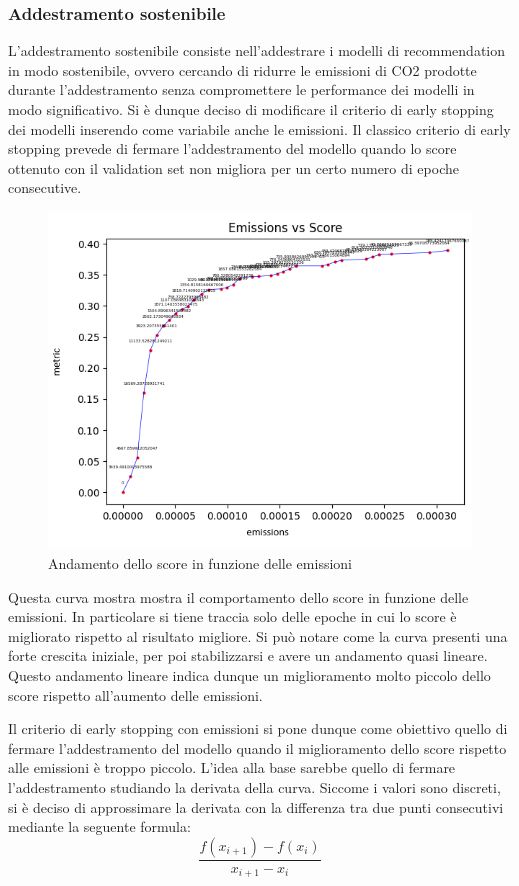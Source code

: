 \subsubsection{Addestramento sostenibile}
L'addestramento sostenibile consiste nell'addestrare i modelli di recommendation in modo sostenibile, ovvero cercando di ridurre le emissioni di CO2 prodotte durante l'addestramento senza compromettere le performance dei modelli in modo significativo.
Si è dunque deciso di modificare il criterio di early stopping dei modelli inserendo come variabile anche le emissioni.
Il classico criterio di early stopping prevede di fermare l'addestramento del modello quando lo score ottenuto con il validation set non migliora per un certo numero di epoche consecutive.


\begin{figure}[H]
    \centering
     \includegraphics[width=\textwidth]{images/curve_emissions_score.png}
    \caption{Andamento dello score in funzione delle emissioni}
\end{figure}

\noindent Questa curva mostra mostra il comportamento dello score in funzione delle emissioni. In particolare si tiene traccia solo delle epoche in cui lo score è migliorato rispetto al risultato migliore.
Si può notare come la curva presenti una forte crescita iniziale, per poi stabilizzarsi e avere un andamento quasi lineare.
Questo andamento lineare indica dunque un miglioramento molto piccolo dello score rispetto all'aumento delle emissioni.

\noindent Il criterio di early stopping con emissioni si pone dunque come obiettivo quello di fermare l'addestramento del modello quando il miglioramento dello score rispetto alle emissioni è troppo piccolo.
L'idea alla base sarebbe quello di fermare l'addestramento studiando la derivata della curva. Siccome i valori sono discreti, si è deciso di approssimare la derivata con la differenza tra due punti consecutivi \cite{differenzedivise} mediante la seguente formula:
\begin{equation}
    \frac{f(x_{i+1}) - f(x_i)}{x_{i+1} - x_i}
\end{equation}

